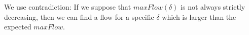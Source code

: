 \begin{proofsketch}
  We use contradiction: If we suppose that $maxFlow\left(\delta\right)$ is not always strictly decreasing, then we can find a
  flow for a specific $\delta$ which is larger than the expected $maxFlow$.
\end{proofsketch}
